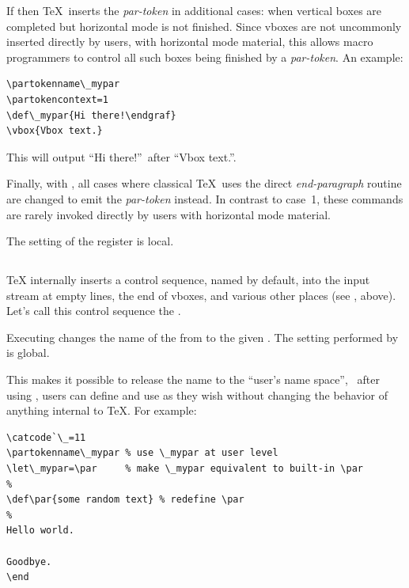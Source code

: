 \documentclass{pdftexmanual}
\begin{document}
If  then \TeX\ inserts the {\em par-token} in
additional cases: when vertical boxes are completed but horizontal mode
is not finished. Since vboxes are not uncommonly inserted directly by
users, with horizontal mode material, this allows macro programmers to
control all such boxes being finished by a {\em par-token}. An example:

\begin{verbatim}
\partokenname\_mypar
\partokencontext=1
\def\_mypar{Hi there!\endgraf}
\vbox{Vbox text.}
\end{verbatim}

This will output ``Hi there!''\ after ``Vbox text.''.

Finally, with , all cases where classical \TeX\
uses the direct {\em end-paragraph} routine are changed to emit the {\em
par-token} instead. In contrast to case~1, these commands are rarely
invoked directly by users with horizontal mode material.

The setting of the register  is local.


\subsection{}

\TeX{} internally inserts a control sequence, named  by
default, into the input stream at empty lines, the end of vboxes, and
various other places (see \cs{partokencontext}, above). Let's call this
control sequence the .

Executing  changes the
name of the \varname{par-token} from \cs{par} to the given
\Something{control sequence}. The setting performed by
 is global.

This makes it possible to release the name  to the ``user's name
space'', \ie\ after using \cs{partokenname}, users can define and use
\cs{par} as they wish without changing the behavior of anything internal
to \TeX{}. For example:

\begin{verbatim}
\catcode`\_=11
\partokenname\_mypar % use \_mypar at user level
\let\_mypar=\par     % make \_mypar equivalent to built-in \par
%
\def\par{some random text} % redefine \par
%
Hello world.

Goodbye.
\end
\end{verbatim}
\end{document}
